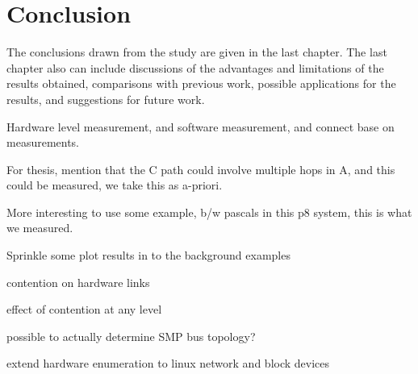 \chapter{Conclusion}
\label{ch:conclusion}

The conclusions drawn from the study are given in the last chapter.
The last chapter also can include discussions of the advantages and limitations of the results obtained, comparisons with previous work, possible applications for the results, and suggestions for future work.



Hardware level measurement, and software measurement, and connect base on measurements.

For thesis, mention that the C path could involve multiple hops in A, and this could be measured, we take this as a-priori.

More interesting to use some example, b/w pascals in this p8 system, this is what we measured.

Sprinkle some plot results in to the background examples

contention on hardware links

effect of contention at any level

possible to actually determine SMP bus topology?


extend hardware enumeration to linux network and block devices
